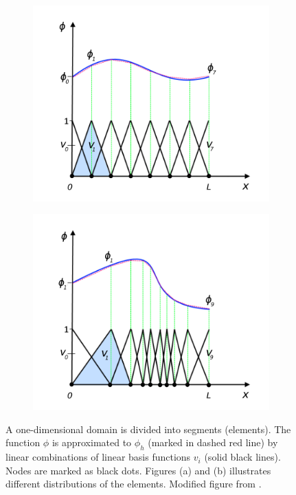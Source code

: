 \begin{figure}[htb!]
    \begin{subfigure}{0.5\textwidth}
        \centering
        \includegraphics[width=\linewidth, trim= 0.5cm 0.5cm 0.5cm 0.5cm, clip]{figures/Ch2/plot-using-linear-combinations(1).png}
        \caption{}
        \label{fig:FEM_1Ddomain_uniform}
    \end{subfigure}
    \begin{subfigure}{0.5\textwidth}
        \centering
        \includegraphics[width=\linewidth, trim= 0.5cm 0.5cm 0.5cm 0.5cm, clip]{figures/Ch2/plot-using-discretization(1).png}
        \caption{}
        \label{fig:FEM_1Ddomain_nonuniform}
    \end{subfigure}
    \caption{A one-dimensional domain is divided into segments (elements). The function $\phi$ is approximated to $\phi_h$ (marked in dashed red line) by linear combinations of linear basis functions $v_i$ (solid black lines). Nodes are marked as black dots. Figures (a) and (b) illustrates different distributions of the elements. Modified figure from \cite{FEM_comsol}.}
    \label{fig:FEM_1Ddomain}
\end{figure}

